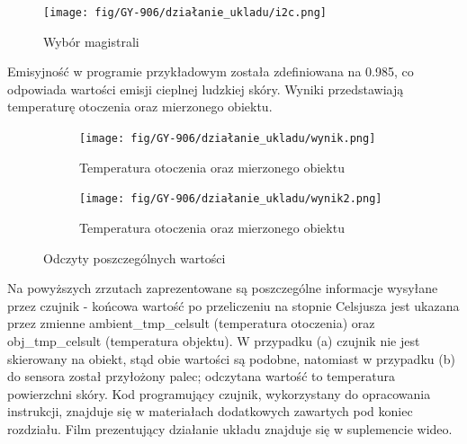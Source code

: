 \documentclass[11pt, a4paper]{article}
\begin{document}
\begin{figure}[h!]
    \centering
    \texttt{[image: fig/GY-906/działanie\_ukladu/i2c.png]}
    \caption{Wybór magistrali}
    \label{fig:my_label}
\end{figure}
\vspace{0.5cm}
\newpage
Emisyjność w programie przykładowym została zdefiniowana na 0.985, co odpowiada wartości emisji cieplnej ludzkiej skóry. Wyniki przedstawiają temperaturę otoczenia oraz mierzonego obiektu.
\vspace{0.5cm}
\begin{figure}[h!]
\begin{subfigure}{.5\textwidth}
  \centering
  \texttt{[image: fig/GY-906/działanie\_ukladu/wynik.png]}
  \caption{Temperatura otoczenia oraz mierzonego obiektu }
  \label{fig:sub1}
\end{subfigure}%
\begin{subfigure}{.5\textwidth}
  \centering
  \texttt{[image: fig/GY-906/działanie\_ukladu/wynik2.png]}
  \caption{Temperatura otoczenia oraz mierzonego obiektu}
  \label{fig:sub2}
\end{subfigure}
\caption{Odczyty poszczególnych wartości}
\label{fig:test}
\end{figure}
\newline
Na powyższych zrzutach zaprezentowane są poszczególne informacje wysyłane przez czujnik - końcowa wartość po przeliczeniu na stopnie Celsjusza jest ukazana przez zmienne ambient\_tmp\_celsult (temperatura otoczenia) oraz obj\_tmp\_celsult (temperatura objektu). W przypadku (a) czujnik nie jest skierowany na obiekt, stąd obie wartości są podobne, natomiast w przypadku (b) do sensora został przyłożony palec; odczytana wartość to temperatura powierzchni skóry.
\vspace{1cm}
\newline
Kod programujący czujnik, wykorzystany do opracowania instrukcji, znajduje się w materiałach dodatkowych zawartych pod koniec rozdziału.
\newline
Film prezentujący działanie układu znajduje się w suplemencie wideo.
\printbibliography[heading=bibintoc]
\end{document}
